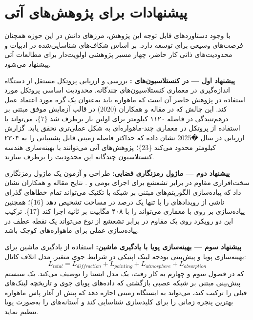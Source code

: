 \documentclass[a4paper,14pt]{extreport}
\begin{document}
\section{پیشنهادات برای پژوهش‌های آتی}

با وجود دستاوردهای قابل توجه این پژوهش، مرزهای دانش در این حوزه همچنان فرصت‌های وسیعی برای توسعه دارد. بر اساس شکاف‌های شناسایی‌شده در ادبیات و محدودیت‌های ذاتی کار حاضر، چهار مسیر پژوهشی اولویت‌دار برای مطالعات آتی پیشنهاد می‌شود.

\textbf{پیشنهاد اول ---  در کنستلاسیون‌های :} بررسی و ارزیابی پروتکل  مستقل از دستگاه اندازه‌گیری  در معماری کنستلاسیون‌های چندگانه. محدودیت اساسی پروتکل  مورد استفاده در پژوهش حاضر آن است که ماهواره باید به‌عنوان یک گره مورد اعتماد  عمل کند. این چالش که در مقاله  و همکاران (2020) در قالب آزمایش موفق  مبتنی بر درهم‌تنیدگی در فاصله ۱۱۲۰ کیلومتر برای اولین بار برطرف شد \{7\}، می‌تواند با استفاده از پروتکل  در معماری چند-ماهواره‌ای به شکل عملی‌تری تحقق یابد. گزارش ارزیابی  در سال �2025 نشان داده که  حداکثر فاصله زمینی قابل پشتیبانی را به ۲۳۰۴ کیلومتر محدود می‌کند \{23\}؛ پژوهش‌های آتی می‌توانند با بهینه‌سازی هندسه کنستلاسیون  چندگانه این محدودیت را برطرف سازند.

\textbf{پیشنهاد دوم --- ماژول رمزنگاری  فضایی:} طراحی و آزمون یک ماژول رمزنگاری سخت‌افزاری مقاوم در برابر تشعشع  برای اجرای بومی  و . نتایج مقاله  و همکاران نشان داد که پیاده‌سازی  الگوریتم‌های مبتنی بر شبکه با تکنیک  می‌تواند تمام خطاهای گذرای ناشی از رویدادهای  را با  تنها یک درصد در مساحت تشخیص دهد \{16\}؛ همچنین پیاده‌سازی  بر روی  با معماری  می‌تواند  را با  ۴۰۸ مگابیت بر ثانیه اجرا کند \{17\}. ترکیب این دو رویکرد روی یک  مقاوم در برابر تشعشع از نوع  می‌تواند یک نقطه عطف در پیاده‌سازی عملی  برای ماهواره‌های کوچک  باشد.

\textbf{پیشنهاد سوم --- بهینه‌سازی پویا با یادگیری ماشین:} استفاده از یادگیری ماشین  برای بهینه‌سازی پویا و پیش‌بینی بودجه لینک اپتیکی  در شرایط جوی متغیر. مدل اتلاف کانال:
\begin{equation}
L_{total} = L_{diffraction} + L_{pointing} + L_{atmosphere} + L_{absorption}
\label{eq:ch5_loss}
\end{equation}
که در فصول سوم و چهارم به کار رفت، یک مدل ایستا را توصیف می‌کند. یک سیستم پیش‌بینی مبتنی بر شبکه عصبی بازگشتی  که داده‌های پویای جوی و تاریخچه  لینک‌های قبلی را ترکیب کند، می‌تواند به ایستگاه زمینی اجازه دهد که پیش از آغاز پاس ماهواره بهترین پنجره زمانی را برای کلیدسازی  شناسایی کند و آستانه‌های  را به‌صورت پویا تنظیم نماید.
\end{document}
